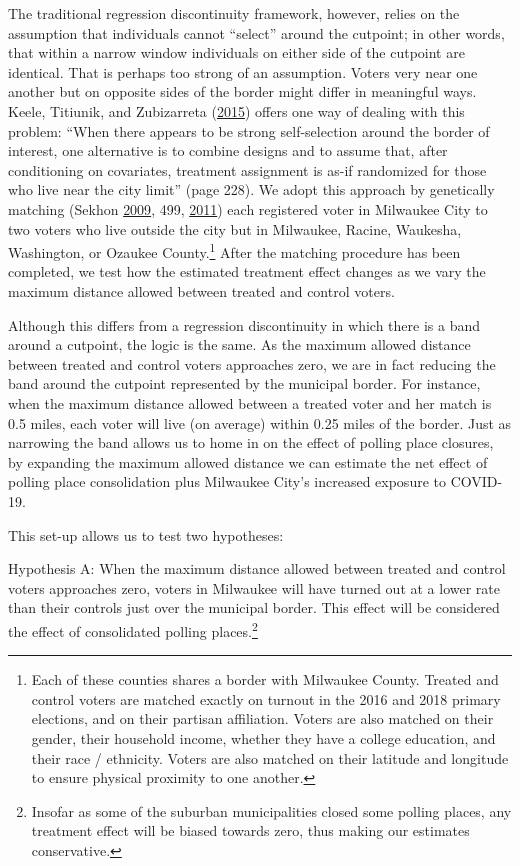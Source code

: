 \documentclass[
  12pt,
]{article}
\begin{document}
The traditional regression discontinuity framework, however, relies on the assumption that individuals cannot ``select'' around the cutpoint; in other words, that within a narrow window individuals on either side of the cutpoint are identical. That is perhaps too strong of an assumption. Voters very near one another but on opposite sides of the border might differ in meaningful ways. Keele, Titiunik, and Zubizarreta (\protect\hyperlink{ref-Keele2015}{2015}) offers one way of dealing with this problem: ``When there appears to be strong self-selection around the border of interest, one alternative is to combine designs and to assume that, after conditioning on covariates, treatment assignment is as-if randomized for those who live near the city limit'' (page 228). We adopt this approach by genetically matching (Sekhon \protect\hyperlink{ref-Sekhon2009}{2009}, 499, \protect\hyperlink{ref-Sekhon2011}{2011}) each registered voter in Milwaukee City to two voters who live outside the city but in Milwaukee, Racine, Waukesha, Washington, or Ozaukee County.\footnote{Each of these counties shares a border with Milwaukee County. Treated and control voters are matched exactly on turnout in the 2016 and 2018 primary elections, and on their partisan affiliation. Voters are also matched on their gender, their household income, whether they have a college education, and their race / ethnicity. Voters are also matched on their latitude and longitude to ensure physical proximity to one another.} After the matching procedure has been completed, we test how the estimated treatment effect changes as we vary the maximum distance allowed between treated and control voters.

Although this differs from a regression discontinuity in which there is a band around a cutpoint, the logic is the same. As the maximum allowed distance between treated and control voters approaches zero, we are in fact reducing the band around the cutpoint represented by the municipal border. For instance, when the maximum distance allowed between a treated voter and her match is 0.5 miles, each voter will live (on average) within 0.25 miles of the border. Just as narrowing the band allows us to home in on the effect of polling place closures, by expanding the maximum allowed distance we can estimate the net effect of polling place consolidation plus Milwaukee City's increased exposure to COVID-19.

This set-up allows us to test two hypotheses:

Hypothesis A: When the maximum distance allowed between treated and control voters approaches zero, voters in Milwaukee will have turned out at a lower rate than their controls just over the municipal border. This effect will be considered the effect of consolidated polling places.\footnote{Insofar as some of the suburban municipalities closed some polling places, any treatment effect will be biased towards zero, thus making our estimates conservative.}
\end{document}
